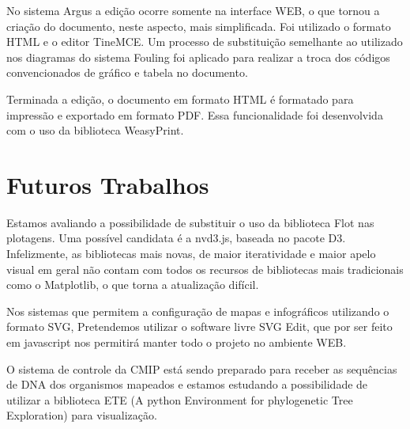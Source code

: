 \documentclass[]{article}
\begin{document}
No sistema Argus a edição ocorre somente na interface WEB, o que tornou a criação do documento, neste aspecto, mais simplificada. Foi utilizado o formato HTML e o editor TineMCE. Um processo de substituição semelhante ao utilizado nos diagramas do sistema Fouling foi aplicado para realizar a troca dos códigos convencionados de gráfico e tabela no documento.

Terminada a edição, o documento em formato HTML é formatado para impressão e exportado em formato PDF. Essa funcionalidade foi desenvolvida com o uso da biblioteca WeasyPrint.

\section{Futuros Trabalhos}

Estamos avaliando a possibilidade de substituir o uso da biblioteca Flot nas plotagens. Uma possível candidata é a nvd3.js, baseada no pacote D3. Infelizmente, as bibliotecas mais novas, de maior iteratividade e maior apelo visual em geral não contam com todos os recursos de bibliotecas mais tradicionais como o Matplotlib, o que torna a atualização difícil.

Nos sistemas que permitem a configuração de mapas e infográficos utilizando o formato SVG, Pretendemos utilizar o software livre SVG Edit, que por ser feito em javascript nos permitirá manter todo o projeto no ambiente WEB.

O sistema de controle da CMIP está sendo preparado para receber as sequências de DNA dos organismos mapeados e estamos estudando a possibilidade de utilizar a biblioteca ETE (A python Environment for phylogenetic Tree Exploration) para visualização. 



\end{document}
